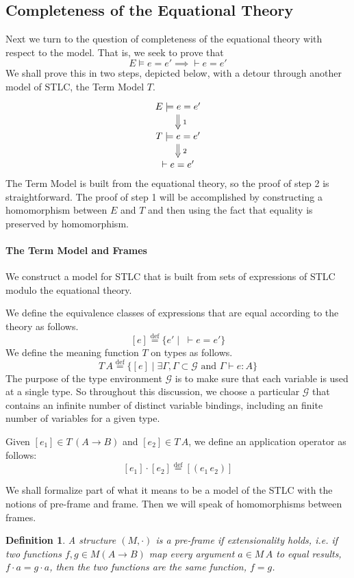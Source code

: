 \documentclass{tufte-handout}
\newcommand{\defeq}[0]{\overset{\mathrm{def}}{=}}
\newcommand{\APP}[0]{\,}
\newtheorem{definition}{Definition}%
\begin{document}
\subsection{Completeness of the Equational Theory}

Next we turn to the question of completeness of the equational theory
with respect to the model. That is, we seek to prove that
\[
    E \models e = e' \implies \vdash e = e'
\]
We shall prove this in two steps, depicted below, with a detour
through another model of STLC, the Term Model $T$.
\[
\xymatrix@=15pt{
  E \models e = e' \ar@{=>}[d]^{\;1} \\
  T \models e = e' \ar@{=>}[d]^{\;2} \\
  \vdash e = e'
}
\]
The Term Model is built from the equational theory, so the proof of
step 2 is straightforward. The proof of step 1 will be accomplished by
constructing a homomorphism between $E$ and $T$ and then using the
fact that equality is preserved by homomorphism.

\paragraph{The Term Model and Frames}

We construct a model for STLC that is built from sets of expressions
of STLC modulo the equational theory.

We define the equivalence classes of expressions that are equal
according to the theory as follows.
\[
  [e] \defeq \{ e' \mid \; \vdash e = e' \}
\]
We define the meaning function $T$ on types as follows.
\[
T\,A \defeq \{ [e] \mid \exists \Gamma, \Gamma \subset \mathcal{G}
  \text{ and } \Gamma \vdash e : A \}
\]
The purpose of the type environment $\mathcal{G}$ is to make sure that
each variable is used at a single type. So throughout this discussion,
we choose a particular $\mathcal{G}$ that contains an infinite number
of distinct variable bindings, including an finite number of variables
for a given type.

Given $[e_1] \in T\,(A\to B)$ and $[e_2] \in T\,A$, we define an
application operator as follows:
\[
    [e_1] \cdot [e_2] \defeq [(e_1\APP e_2)]
\]

We shall formalize part of what it means to be a model of the STLC
with the notions of pre-frame and frame. Then we will speak of
homomorphisms between frames.

\begin{definition}
A structure $(M,\cdot)$ is a \emph{pre-frame} if extensionality
holds, i.e. if two functions $f,g \in M (A \to B)$ map every argument
$a \in M\,A$ to equal results, $f \cdot a = g \cdot a$, then the two
functions are the same function, $f = g$.
\end{definition}
\end{document}
